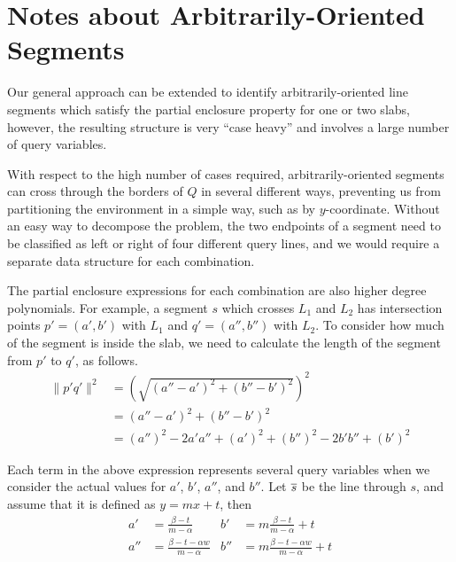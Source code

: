 \section{Notes about Arbitrarily-Oriented Segments}
\label{:slabs:remarks}

Our general approach can be extended to identify arbitrarily-oriented line segments which satisfy the partial enclosure property for one or two slabs, however, the resulting structure is very ``case heavy'' and involves a large number of query variables.

With respect to the high number of cases required, arbitrarily-oriented segments can cross through the borders of $Q$ in several different ways, preventing us from partitioning the environment in a simple way, such as by $y$-coordinate.
Without an easy way to decompose the problem, the two endpoints of a segment need to be classified as left or right of four different query lines, and we would require a separate data structure for each combination.

The partial enclosure expressions for each combination are also higher degree polynomials.
For example, a segment $s$ which crosses $L_1$ and $L_2$ has intersection points $p' = (a', b')$ with $L_1$ and $q' = (a'', b'')$ with $L_2$.  
To consider how much of the segment is inside the slab, we need to calculate the length of the segment from $p'$ to $q'$, as follows.
\[
\begin{split}
\|p'q'\|^2 
&= \left( \sqrt{(a'' - a')^2 + (b'' - b')^2} \right)^2 \\
%
&= (a'' - a')^2 + (b'' - b')^2 \\
%
&= (a'')^2 - 2a'a'' + (a')^2 + (b'')^2 - 2b'b'' + (b')^2
\end{split}
\]

Each term in the above expression represents several query variables when we consider the actual values for $a'$, $b'$, $a''$, and $b''$.  
Let $\overline{s}$ be the line through $s$, and assume that it is defined as $y = mx + t$, then
\begin{align*}
a'  &= \frac{\beta - t}{m - \alpha}
&b'  &= m \frac{\beta - t}{m - \alpha} + t \\
a'' &= \frac{\beta - t - \alpha w}{m - \alpha} 
&b'' &= m \frac{\beta - t - \alpha w}{m - \alpha} + t \\
\end{align*}

